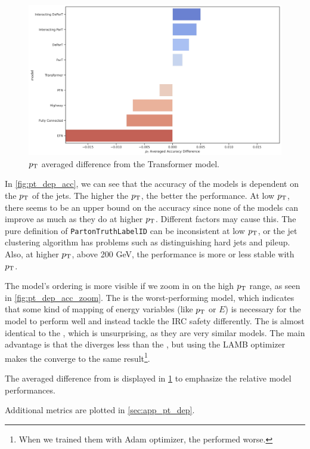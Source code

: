 \begin{figure}[htb]
    \centering
    \includegraphics[width=1\linewidth]{src/plots/results/pT_dep/relative_error.jpg}
    \caption{$p_\text{T}$ averaged difference from the Transformer model.}
    \label{fig:pt_dep_diff}
\end{figure}
In \cref{fig:pt_dep_acc}, we can see that the accuracy of the models is dependent on the $p_\text{T}$ of the jets.
The higher the $p_\text{T}$, the better the performance.
At low $p_\text{T}$, there seems to be an upper bound on the accuracy since none of the models can improve as much as they do at higher $p_\text{T}$.
Different factors may cause this.
The pure definition of \texttt{PartonTruthLabelID} can be inconsistent at low $p_\text{T}$, or the jet clustering algorithm has problems such as distinguishing hard jets and pileup.
Also, at higher $p_\text{T}$, above 200 GeV, the performance is more or less stable with $p_\text{T}$.

The model's ordering is more visible if we zoom in on the high $p_\text{T}$ range, as seen in \cref{fig:pt_dep_acc_zoom}.
The \EFN is the worst-performing model, which indicates that some kind of mapping of energy variables (like $p_\text{T}$ or $E$) is necessary for the model to perform well and instead tackle the IRC safety differently.
The \highway is almost identical to the \fc, which is unsurprising, as they are very similar models.
The main advantage is that the \highway diverges less than the \fc, but using the LAMB optimizer makes the \fc converge to the same result\footnote{When we trained them with Adam optimizer, the \fc performed worse.}.

The averaged difference from \trans is displayed in \cref{fig:pt_dep_diff} to emphasize the relative model performances. 

Additional metrics are plotted in \cref{sec:app_pt_dep}.

